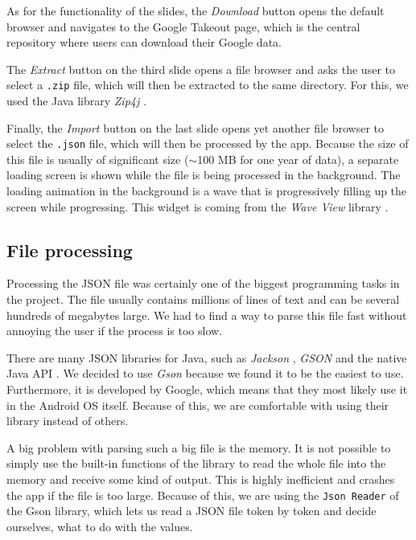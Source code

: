 \documentclass[12p]{article}
\begin{document}
            As for the functionality of the slides, the \textit{Download} button opens the default browser and navigates to the Google Takeout page, which is the central repository where users can download their Google data.
            
            The \textit{Extract} button on the third slide opens a file browser and asks the user to select a \texttt{.zip} file, which will then be extracted to the same directory. For this, we used the Java library \textit{Zip4j} \cite{zip4j}.
            
            Finally, the \textit{Import} button on the last slide opens yet another file browser to select the \texttt{.json} file, which will then be processed by the app. Because the size of this file is usually of significant size ($\sim$100 MB for one year of data), a separate loading screen is shown while the file is being processed in the background. The loading animation in the background is a wave that is progressively filling up the screen while progressing. This widget is coming from the \textit{Wave View} library \cite{WaveView}.
            
            \subsection{File processing}
            
            Processing the JSON file was certainly one of the biggest programming tasks in the project. The file usually contains millions of lines of text and can be several hundreds of megabytes large. We had to find a way to parse this file fast without annoying the user if the process is too slow.
            
            There are many JSON libraries for Java, such as \textit{Jackson} \cite{Jackson},  \textit{GSON} \cite{Gson} and the native Java API \cite{JavaJsonNative}. We decided to use \textit{Gson} because we found it to be the easiest to use. Furthermore, it is developed by Google, which means that they most likely use it in the Android OS itself. Because of this, we are comfortable with using their library instead of others.
            
            A big problem with parsing such a big file is the memory. It is not possible to simply use the built-in functions of the library to read the whole file into the memory and receive some kind of output. This is highly inefficient and crashes the app if the file is too large. Because of this, we are using the \texttt{Json Reader} of the Gson library, which lets us read a JSON file token by token and decide ourselves, what to do with the values.
            
\end{document}
